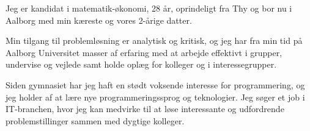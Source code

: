 \documentclass[9pt]{template/developercv}
\begin{document}
\vspace{1em}


\begin{minipage}[t]{0.525\textwidth}
  \vspace{-\baselineskip}

  Jeg er kandidat i matematik-økonomi, 28 år, oprindeligt fra Thy og bor nu i Aalborg med min kæreste og vores 2-årige datter.

  \medskip
  Min tilgang til problemløsning er analytisk og kritisk, og jeg har fra min tid på Aalborg Universitet masser af erfaring med at arbejde effektivt i grupper, undervise og vejlede samt holde oplæg for kolleger og i interessegrupper.

  \medskip
  Siden gymnasiet har jeg haft en stødt voksende interesse for programmering, og jeg holder af at lære nye programmeringssprog og teknologier.
  Jeg søger et job i IT-branchen, hvor jeg kan medvirke til at løse interessante og udfordrende problemstillinger sammen med dygtige kolleger.

\end{minipage}
\hfill
\begin{minipage}[t]{0.23\textwidth}
  \vspace{-\baselineskip}
  \begin{barchart}{2.5}
  \end{barchart}
\end{minipage}
\hfill
\begin{minipage}[t]{0.17\textwidth}
  \vspace{-\baselineskip}
  \begin{barchart}{2.5}
  \end{barchart}
\end{minipage}

\begin{center}
\end{center}
\end{document}
